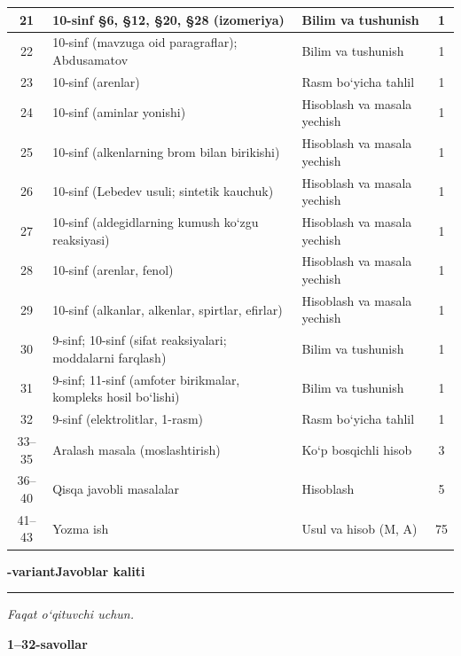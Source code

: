 \documentclass[11pt,a4paper]{article}
\newcommand{\hdrpill}[1]{\begin{tikzpicture}[baseline=0pt]\node[fill=ygreen,text=white,rounded corners=8pt,inner xsep=10pt,inner ysep=5pt,font=\fontsize{13}{15}\bfseries\selectfont] at (0,0.475){#1};\end{tikzpicture}}
\newcommand{\curvar}{}\fancyhead[R]{\hdrpill{\curvar}}
\begin{document}
{\begin{longtable}{|c|p{7.2cm}|p{5.4cm}|c|}
21 & 10-sinf \S{}6, \S{}12, \S{}20, \S{}28 (izomeriya) & Bilim va tushunish & 1\\\hline
22 & 10-sinf (mavzuga oid paragraflar); Abdusamatov & Bilim va tushunish & 1\\\hline
23 & 10-sinf (arenlar) & Rasm bo`yicha tahlil & 1\\\hline
24 & 10-sinf (aminlar yonishi) & Hisoblash va masala yechish & 1\\\hline
25 & 10-sinf (alkenlarning brom bilan birikishi) & Hisoblash va masala yechish & 1\\\hline
26 & 10-sinf (Lebedev usuli; sintetik kauchuk) & Hisoblash va masala yechish & 1\\\hline
27 & 10-sinf (aldegidlarning kumush ko`zgu reaksiyasi) & Hisoblash va masala yechish & 1\\\hline
28 & 10-sinf (arenlar, fenol) & Hisoblash va masala yechish & 1\\\hline
29 & 10-sinf (alkanlar, alkenlar, spirtlar, efirlar) & Hisoblash va masala yechish & 1\\\hline
30 & 9-sinf; 10-sinf (sifat reaksiyalari; moddalarni farqlash) & Bilim va tushunish & 1\\\hline
31 & 9-sinf; 11-sinf (amfoter birikmalar, kompleks hosil bo`lishi) & Bilim va tushunish & 1\\\hline
32 & 9-sinf (elektrolitlar, 1-rasm) & Rasm bo`yicha tahlil & 1\\\hline
33--35 & Aralash masala (moslashtirish) & Ko`p bosqichli hisob & 3\\\hline
36--40 & Qisqa javobli masalalar & Hisoblash & 5\\\hline
41--43 & Yozma ish & Usul va hisob (M, A) & 75\\\hline
\end{longtable}}
\renewcommand{\curvar}{Javoblar}
\newpage
\noindent\textbf{\fontsize{13}{15}-variant}\hfill \textbf{Javoblar kaliti}\par\smallskip\hrule\smallskip
\textit{Faqat o`qituvchi uchun.}\par\medskip
\noindent\textbf{1--32-savollar}\par\smallskip
\end{document}
